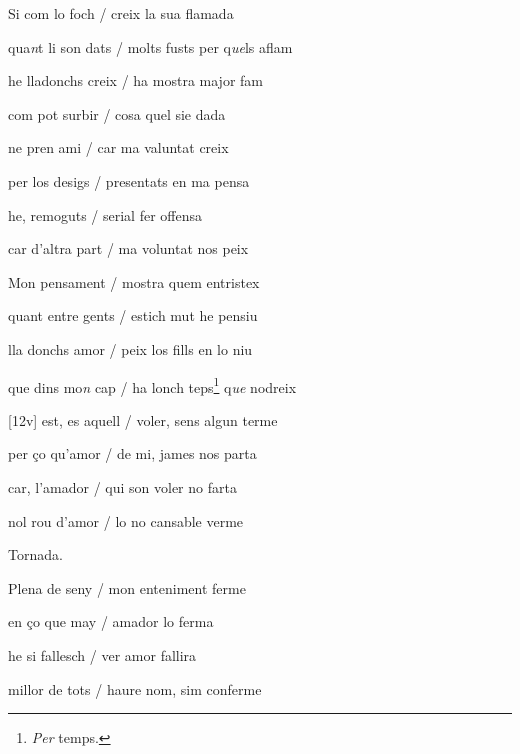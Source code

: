 \documentclass[12pt]{article}
\begin{document}
\begin{estrofa}

 Si com lo foch / creix la sua flamada

 qua\textit{n}t li son dats / molts fusts per q\textit{ue}ls aflam

 he lladonchs creix / ha mostra major fam

 com pot surbir / cosa quel sie dada

 ne pren ami / car ma valuntat creix

 per los desigs / presentats en ma pensa

 he, remoguts / serial fer offensa

 car d'altra part / ma voluntat nos peix

\end{estrofa}



\begin{estrofa}

 Mon pensament / mostra quem entristex

 quant entre gents / estich mut he pensiu

 lla donchs amor / peix los fills en lo niu

 que dins mo\textit{n }cap / ha lonch teps\footnote{\textit{Per }temps.}
q\textit{ue} nodreix

 [12v] est, es aquell / voler, sens algun terme

 per \c{c}o qu'amor / de mi, james nos parta

 car, l'amador / qui son voler no farta

 nol rou \cite{ref19} d'amor / lo no cansable verme

\end{estrofa}


\begin{estrofaExtra}%




\begin{tornada}

Tornada.

\end{tornada}


\end{estrofaExtra}


\begin{estrofa}

 Plena de seny / mon enteniment ferme

 en \c{c}o que may / amador lo ferma

 he si fallesch / ver amor fallira

 millor de tots / haure nom, sim conferme

\end{estrofa}
\end{document}

